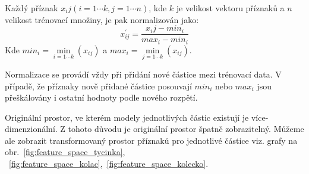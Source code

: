 \documentclass[11pt,twoside,a4paper,table]{book}
\begin{document}
Každý příznak $x_ij (i = 1\cdots k, j = 1\cdots n)$, kde $k$ je velikost vektoru příznaků a $n$ velikost trénovací množiny, je pak normalizován jako:
\begin{equation}
x^\prime_{ij} = \frac{x_ij - min_i}{max_i - min_i}
\end{equation}
Kde $min_i = \min\limits_{i=1\cdots k}(x_{ij})$ a $max_i = \min\limits_{j=1\cdots k}(x_{ij})$.

Normalizace se provádí vždy při přidání nové částice mezi trénovací data. V případě, že příznaky nově přidané částice posouvají $min_i$ nebo $max_i$ jsou přeškálovány i ostatní hodnoty podle nového rozpětí.

Originální prostor, ve kterém modely jednotlivých částic existují je více-dimenzionální. Z tohoto důvodu je originální prostor špatně zobrazitelný. Můžeme ale zobrazit transformovaný prostor příznaků pro jednotlivé částice viz. grafy na obr.~\ref{fig:feature_space_tycinka}, ~\ref{fig:feature_space_kolac},~\ref{fig:feature_space_kolecko}.
\end{document}
